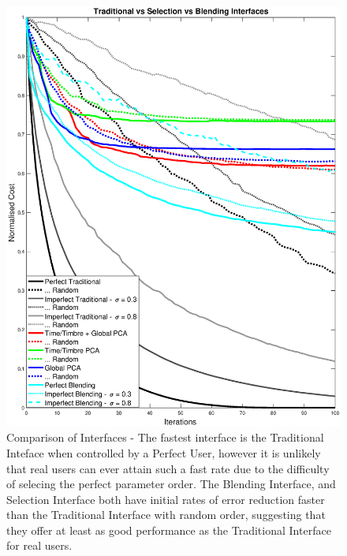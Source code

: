 \documentclass[11pt, oneside]{report}   	%
\begin{document}
\begin{figure}
	\hspace{-50pt}
	\includegraphics[trim = {0, 2cm, 0, 0}, clip, width = 7.6in]{comparisonOfAllInterfaceGraph3.eps}
	\caption{Comparison of Interfaces - The fastest interface is the Traditional Inteface when controlled by a Perfect User, however it is unlikely that real users can ever attain such a fast rate due to the difficulty of selecing the perfect parameter order. The Blending Interface, and Selection Interface both have initial rates of error reduction faster than the Traditional Interface with random order, suggesting that they offer at least as good performance as the Traditional Interface for real users.}
	\label{fig:CombinedTest1}
\end{figure}
\end{document}
